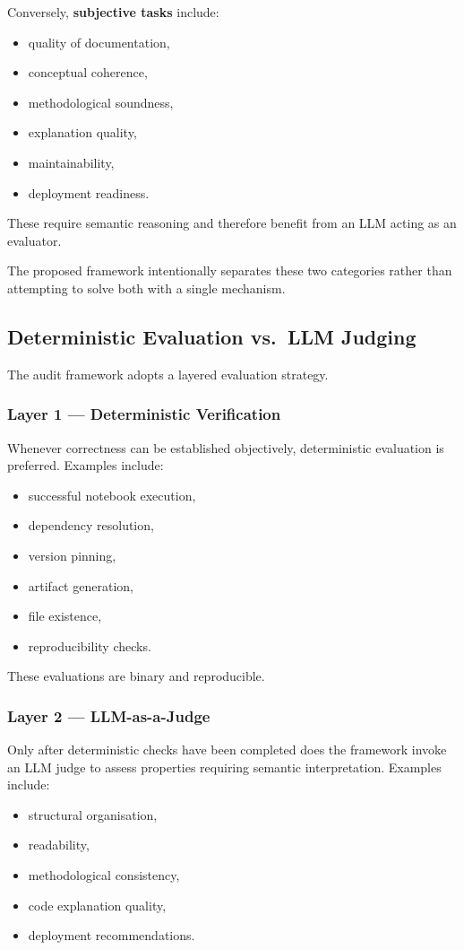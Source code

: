 \documentclass[11pt, a4paper]{article}
\begin{document}
Conversely, \textbf{subjective tasks} include:
\begin{itemize}
  \item quality of documentation,
  \item conceptual coherence,
  \item methodological soundness,
  \item explanation quality,
  \item maintainability,
  \item deployment readiness.
\end{itemize}
These require semantic reasoning and therefore benefit from an LLM acting as
an evaluator.

The proposed framework intentionally separates these two categories rather
than attempting to solve both with a single mechanism.

\subsection{Deterministic Evaluation vs.\ LLM Judging}

The audit framework adopts a layered evaluation strategy.

\subsubsection*{Layer 1 — Deterministic Verification}

Whenever correctness can be established objectively, deterministic evaluation
is preferred. Examples include:
\begin{itemize}
  \item successful notebook execution,
  \item dependency resolution,
  \item version pinning,
  \item artifact generation,
  \item file existence,
  \item reproducibility checks.
\end{itemize}
These evaluations are binary and reproducible.

\subsubsection*{Layer 2 — LLM-as-a-Judge}

Only after deterministic checks have been completed does the framework invoke
an LLM judge to assess properties requiring semantic interpretation. Examples
include:
\begin{itemize}
  \item structural organisation,
  \item readability,
  \item methodological consistency,
  \item code explanation quality,
  \item deployment recommendations.
\end{itemize}
\end{document}
